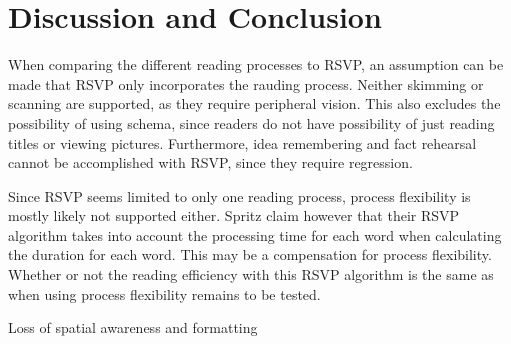 \section{Discussion and Conclusion}
When comparing the different reading processes to RSVP, an assumption can be made that RSVP only incorporates the rauding process. Neither skimming or scanning are supported, as they require peripheral vision. This also excludes the possibility of using schema, since readers do not have possibility of just reading titles or viewing pictures. Furthermore, idea remembering and fact rehearsal cannot be accomplished with RSVP, since they require regression. 

Since RSVP seems limited to only one reading process, process flexibility is mostly likely not supported either. Spritz claim however that their RSVP algorithm takes into account the processing time for each word when calculating the duration for each word. This may be a compensation for process flexibility. Whether or not the reading efficiency with this RSVP algorithm is the same as when using process flexibility remains to be tested.

Loss of spatial awareness and formatting
